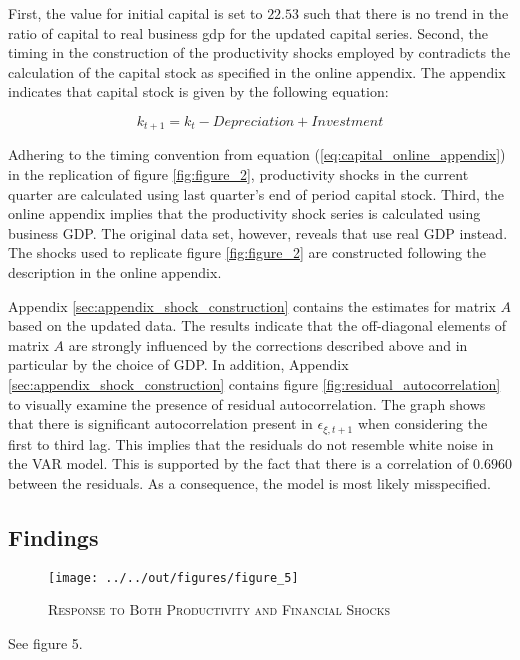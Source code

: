 First, the value for initial capital is set to $22.53$ such that there is no trend in the ratio of capital to real business gdp for the updated capital series. Second, the timing in the construction of the productivity shocks employed by \citeauthor{JERMANNfinancial} contradicts the calculation of the capital stock as specified in the online appendix. The appendix indicates that capital stock is given by the following equation:

\begin{equation} 
\label{eq:capital_online_appendix}
k_{t+1} = k_{t} - Depreciation + Investment
\end{equation} 

Adhering to the timing convention from equation (\ref{eq:capital_online_appendix}) in the replication of figure \ref{fig:figure_2}, productivity shocks in the current quarter are calculated using last quarter's end of period capital stock. 
Third, the online appendix implies that the productivity shock series is calculated using business GDP. The original data set, however, reveals that \citeauthor{JERMANNfinancial} use real GDP instead. The shocks used to replicate figure \ref{fig:figure_2} are constructed following the description in the online appendix. 

Appendix \ref{sec:appendix_shock_construction} contains the estimates for matrix $A$ based on the updated data. The results indicate that the off-diagonal elements of matrix $A$ are strongly influenced by the corrections described above and in particular by the choice of GDP. 
In addition, Appendix \ref{sec:appendix_shock_construction} contains figure \ref{fig:residual_autocorrelation} to visually examine the presence of residual autocorrelation.
The graph shows that there is significant autocorrelation present in ${\epsilon}_{\xi,t+1}$ when considering the first to third lag. This implies that the residuals do not resemble white noise in the VAR model. This is supported by the fact that there is a correlation of $0.6960$ between the residuals. As a consequence, the model is most likely misspecified.


\subsection{Findings}
\label{sec:findings}

\begin{figure}[t]
	\begin{center}
	    \texttt{[image: ../../out/figures/figure\_5]}
	    \caption{\textsc{Response to Both Productivity and Financial Shocks}}
	    \label{fig:figure_5}
    \end{center}
\end{figure}

See figure 5.